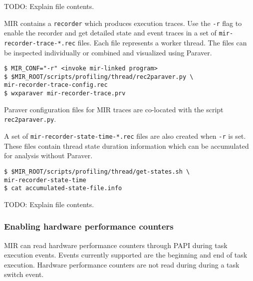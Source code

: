 \documentclass[11pt,a4paper]{article}
\begin{document}
TODO: Explain file contents.

MIR contains a \texttt{recorder} which produces execution traces. Use the \texttt{-r} flag to enable the recorder and get detailed state and event traces in a set of \texttt{mir-recorder-trace-*.rec} files.  Each file represents a worker thread. The files can be inspected individually or combined and visualized using Paraver.

\begin{lstlisting}[style=MyInputStyle]
$ MIR_CONF="-r" <invoke mir-linked program>
$ $MIR_ROOT/scripts/profiling/thread/rec2paraver.py \
mir-recorder-trace-config.rec
$ wxparaver mir-recorder-trace.prv
\end{lstlisting}

Paraver configuration files for MIR traces are co-located with the script \texttt{rec2paraver.py}.

A set of \texttt{mir-recorder-state-time-*.rec} files are also created when \texttt{-r} is set. These files contain thread state duration information which can be accumulated for analysis without Paraver.

\begin{lstlisting}[style=MyInputStyle]
$ $MIR_ROOT/scripts/profiling/thread/get-states.sh \
mir-recorder-state-time
$ cat accumulated-state-file.info
\end{lstlisting}

TODO: Explain file contents.

\subsubsection{Enabling hardware performance counters}\label{enabling-hardware-performance-counters}

MIR can read hardware performance counters through PAPI during task execution events. Events currently supported are the beginning and end of task execution.
Hardware performance counters are not read during during a task switch event.
\end{document}
